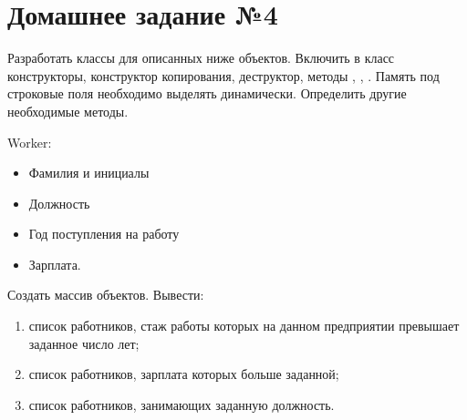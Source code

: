 \section*{Домашнее задание №4}

Разработать классы для описанных ниже объектов. Включить в класс
конструкторы, конструктор копирования, деструктор, методы ,
, . Память под строковые поля необходимо выделять
динамически. Определить другие необходимые методы.

Worker:
\begin{itemize}
	\item Фамилия и инициалы
	\item Должность
	\item Год поступления на работу
	\item Зарплата.
\end{itemize}

Создать массив объектов. Вывести:
\begin{enumerate}
	\item список работников, стаж работы которых на данном предприятии превышает заданное число лет;
	\item список работников, зарплата которых больше заданной;
	\item список работников, занимающих заданную должность.
\end{enumerate}
